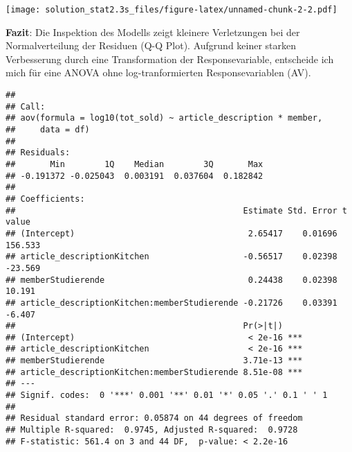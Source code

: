 \documentclass[
]{article}
\newenvironment{Shaded}{\begin{snugshade}}{\end{snugshade}}
\newcommand{\CommentTok}[1]{\textcolor[rgb]{0.56,0.35,0.01}{\textit{#1}}}
\newcommand{\DataTypeTok}[1]{\textcolor[rgb]{0.13,0.29,0.53}{#1}}
\newcommand{\KeywordTok}[1]{\textcolor[rgb]{0.13,0.29,0.53}{\textbf{#1}}}
\newcommand{\NormalTok}[1]{#1}
\newcommand{\OperatorTok}[1]{\textcolor[rgb]{0.81,0.36,0.00}{\textbf{#1}}}
\newcommand{\StringTok}[1]{\textcolor[rgb]{0.31,0.60,0.02}{#1}}
\begin{document}
\texttt{[image: solution\_stat2.3s\_files/figure-latex/unnamed-chunk-2-2.pdf]}

{ \textbf{Fazit}: Die Inspektion des Modells zeigt kleinere Verletzungen
bei der Normalverteilung der Residuen (Q-Q Plot). Aufgrund keiner
starken Verbesserung durch eine Transformation der Responsevariable,
entscheide ich mich für eine ANOVA ohne log-tranformierten
Responsevariablen (AV).}

\begin{Shaded}
\end{Shaded}

\begin{verbatim}
## 
## Call:
## aov(formula = log10(tot_sold) ~ article_description * member, 
##     data = df)
## 
## Residuals:
##       Min        1Q    Median        3Q       Max 
## -0.191372 -0.025043  0.003191  0.037604  0.182842 
## 
## Coefficients:
##                                              Estimate Std. Error t value
## (Intercept)                                   2.65417    0.01696 156.533
## article_descriptionKitchen                   -0.56517    0.02398 -23.569
## memberStudierende                             0.24438    0.02398  10.191
## article_descriptionKitchen:memberStudierende -0.21726    0.03391  -6.407
##                                              Pr(>|t|)    
## (Intercept)                                   < 2e-16 ***
## article_descriptionKitchen                    < 2e-16 ***
## memberStudierende                            3.71e-13 ***
## article_descriptionKitchen:memberStudierende 8.51e-08 ***
## ---
## Signif. codes:  0 '***' 0.001 '**' 0.01 '*' 0.05 '.' 0.1 ' ' 1
## 
## Residual standard error: 0.05874 on 44 degrees of freedom
## Multiple R-squared:  0.9745, Adjusted R-squared:  0.9728 
## F-statistic: 561.4 on 3 and 44 DF,  p-value: < 2.2e-16
\end{verbatim}
\end{document}
